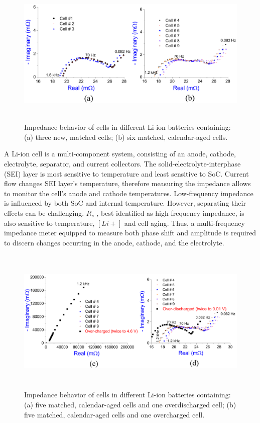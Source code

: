 \begin{figure}[H]
	\includegraphics[width=16cm,height=7cm]{figures/impedence1}
	\centering
	\caption{Impedance behavior of cells in different Li-ion batteries containing: (a) three new, matched cells; (b) six matched, calendar-aged cells.} \label{impedence1}
\end{figure}

\hspace{0.5cm}
A Li-ion cell is a multi-component system, consisting of an anode, cathode, electrolyte, separator, and current collectors. The solid-electrolyte-interphase (SEI) layer is most sensitive to temperature and least sensitive to SoC. Current flow changes SEI layer’s temperature, therefore measuring the impedance allows to monitor the cell’s anode and cathode temperatures. Low-frequency impedance is influenced by both SoC and internal temperature. However, separating their effects can be challenging. $R_s$ , best identified as high-frequency impedance, is also sensitive to temperature, $[Li+]$ and cell aging. Thus, a multi-frequency impedance meter equipped to measure both phase shift and amplitude is required to discern changes occurring in the anode, cathode, and the electrolyte.

\begin{figure}[H]	
	\includegraphics[width=16cm,height=7cm]{figures/impedence2}
	\centering
	\caption{Impedance behavior of cells in different Li-ion batteries containing: (a) five matched, calendar-aged cells and one overdischarged cell; (b) five matched, calendar-aged cells and one overcharged cell.} \label{impedence2}
\end{figure}

